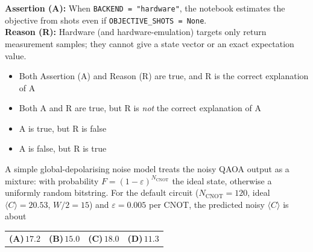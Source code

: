 \documentclass[11pt,a4paper]{article}
\newcommand{\optlabel}[1]{\textbf{(#1)}}
\newenvironment{qitem}[1]{\begin{list}{}{\setlength{\leftmargin}{3.3em}\setlength{\labelwidth}{3.1em}%
  \setlength{\labelsep}{0.2em}\setlength{\topsep}{3pt}\setlength{\parsep}{3pt}}\item[\textbf{Q.#1}\hfill]}{\end{list}}
\newcommand{\qsep}{\par\vspace{2pt}{\color{black!15}\hrule}\vspace{4pt}}
\begin{document}
\begin{qitem}{70}
\textbf{Assertion (A):} When \texttt{BACKEND = "hardware"}, the notebook estimates the objective from shots even if
\texttt{OBJECTIVE\_SHOTS = None}.\\[1mm]
\textbf{Reason (R):} Hardware (and hardware-emulation) targets only return measurement samples; they cannot give a state vector or an
exact expectation value.
\begin{itemize}[leftmargin=2.6em, labelsep=0.4em, itemsep=2pt, topsep=3pt]
\item[\optlabel{A}] Both Assertion (A) and Reason (R) are true, and R is the correct explanation of A
\item[\optlabel{B}] Both A and R are true, but R is \emph{not} the correct explanation of A
\item[\optlabel{C}] A is true, but R is false
\item[\optlabel{D}] A is false, but R is true
\end{itemize}
\end{qitem}
\qsep

\begin{qitem}{71}
A simple global-depolarising noise model treats the noisy QAOA output as a mixture: with probability $F = (1 - \varepsilon)^{N_{\text{CNOT}}}$
the ideal state, otherwise a uniformly random bitstring. For the default circuit ($N_{\text{CNOT}} = 120$, ideal $\langle C\rangle = 20.53$,
$W/2 = 15$) and $\varepsilon = 0.005$ per CNOT, the predicted noisy $\langle C\rangle$ is about
\par\smallskip\noindent\begin{tabularx}{\linewidth}{@{}*{4}{L}@{}}
\optlabel{A}\,$17.2$ & \optlabel{B}\,$15.0$ & \optlabel{C}\,$18.0$ & \optlabel{D}\,$11.3$
\end{tabularx}
\end{qitem}
\qsep
\end{document}
